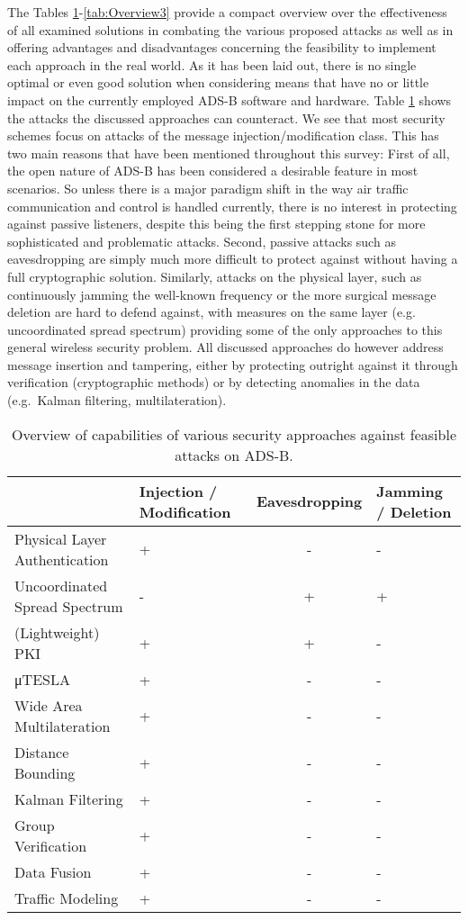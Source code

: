 \documentclass[english]{IEEEtran}
\providecommand{\tabularnewline}{\\}
\begin{document}
The Tables \ref{tab:Overview1}-\ref{tab:Overview3} provide a compact
overview over the effectiveness of all examined solutions in combating
the various proposed attacks as well as in offering advantages and
disadvantages concerning the feasibility to implement each approach
in the real world. As it has been laid out, there is no single optimal
or even good solution when considering means that have no or little
impact on the currently employed ADS-B software and hardware. Table
\ref{tab:Overview1} shows the attacks the discussed approaches can
counteract. We see that most security schemes focus on attacks of
the message injection/modification class. This has two main reasons
that have been mentioned throughout this survey: First of all, the
open nature of ADS-B has been considered a desirable feature in most
scenarios. So unless there is a major paradigm shift in the way air
traffic communication and control is handled currently, there is no
interest in protecting against passive listeners, despite this being
the first stepping stone for more sophisticated and problematic attacks.
Second, passive attacks such as eavesdropping are simply much more
difficult to protect against without having a full cryptographic solution.
Similarly, attacks on the physical layer, such as continuously jamming
the well-known frequency or the more surgical message deletion are
hard to defend against, with measures on the same layer (e.g. uncoordinated
spread spectrum) providing some of the only approaches to this general
wireless security problem. All discussed approaches do however address
message insertion and tampering, either by protecting outright against
it through verification (cryptographic methods) or by detecting anomalies
in the data (e.g.~Kalman filtering, multilateration).
\begin{table}[t]
\begin{tabular}{|>{\centering}p{24mm}|>{\centering}p{1.5cm}|c|>{\centering}p{1.5cm}|}
\hline 
 & Injection / Modification & Eavesdropping & Jamming / Deletion\tabularnewline
\hline 
\hline 
Physical Layer Authentication & + & - & -\tabularnewline
\hline 
Uncoordinated Spread Spectrum & - & + & +\tabularnewline
\hline 
(Lightweight) PKI & + & + & -\tabularnewline
\hline 
μTESLA & + & - & -\tabularnewline
\hline 
Wide Area Multilateration & + & - & -\tabularnewline
\hline 
Distance Bounding & + & - & -\tabularnewline
\hline 
Kalman Filtering & + & - & -\tabularnewline
\hline 
Group Verification & + & - & -\tabularnewline
\hline 
Data Fusion & + & - & -\tabularnewline
\hline 
Traffic Modeling & + & - & -\tabularnewline
\hline 
\end{tabular}

\caption{Overview of capabilities of various security approaches against feasible
attacks on ADS-B. \label{tab:Overview1}}
\end{table}
\end{document}
